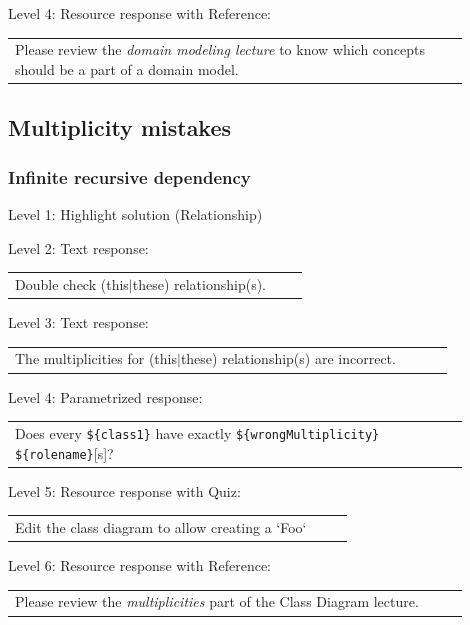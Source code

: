\noindent Level 4: Resource response with Reference: \medskip

\begin{tabular}{|p{0.9\linewidth}}
Please review the \textit{domain modeling lecture} to know which concepts should be a part of a domain model.
\end{tabular} \medskip


\subsection{Multiplicity mistakes}

\subsubsection{Infinite recursive dependency}

\noindent Level 1: Highlight solution (Relationship) \medskip

\noindent Level 2: Text response: \medskip

\begin{tabular}{|p{0.9\linewidth}}
Double check (this$|$these) relationship(s).
\end{tabular} \medskip

\noindent Level 3: Text response: \medskip

\begin{tabular}{|p{0.9\linewidth}}
The multiplicities for (this$|$these) relationship(s) are incorrect.
\end{tabular} \medskip

\noindent Level 4: Parametrized response: \medskip

\begin{tabular}{|p{0.9\linewidth}}
Does every \verb|${class1}| have exactly \verb|${wrongMultiplicity}| \verb|${rolename}|[s]?
\end{tabular} \medskip

\noindent Level 5: Resource response with Quiz: \medskip

\begin{tabular}{|p{0.9\linewidth}}
Edit the class diagram to allow creating a `Foo`
\end{tabular} \medskip

\noindent Level 6: Resource response with Reference: \medskip

\begin{tabular}{|p{0.9\linewidth}}
Please review the \textit{multiplicities} part of the Class Diagram lecture.
\end{tabular} \medskip


